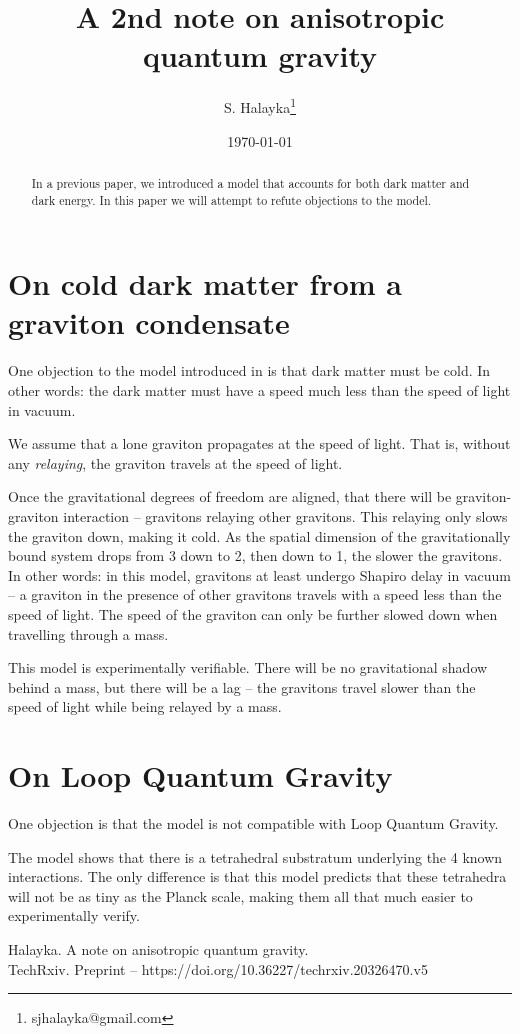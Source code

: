 \documentclass[12pt]{article}
\title{A 2nd note on anisotropic quantum gravity}
\author{S. Halayka\footnote{sjhalayka@gmail.com}}
\date{\today\;\currenttime}
\begin{document}
 
\maketitle

\begin{abstract}
In a previous paper, we introduced a model that accounts for both dark matter and dark energy. In this paper we will attempt to refute objections to the model.
\end{abstract}


\section{On cold dark matter from a graviton condensate}

One objection to the model introduced in \cite{halayka} is that dark matter must be cold. 
In other words: the dark matter must have a speed much less than the speed of light in vacuum.

We assume that a lone graviton propagates at the speed of light. 
That is, without any {\textit{relaying}}, the graviton travels at the speed of light.

Once the gravitational degrees of freedom are aligned, that there will be graviton-graviton interaction -- gravitons relaying other gravitons. 
This relaying only slows the graviton down, making it cold. 
As the spatial dimension of the gravitationally bound system drops from 3 down to 2, then down to 1, the slower the gravitons.
In other words: in this model, gravitons at least undergo Shapiro delay in vacuum -- a graviton in the presence of other gravitons travels with a speed less than the speed of light.
The speed of the graviton can only be further slowed down when travelling through a mass.

This model is experimentally verifiable. 
There will be no gravitational shadow behind a mass, but there will be a lag -- the gravitons travel slower than the speed of light while being relayed by a mass.






\section{On Loop Quantum Gravity}

One objection is that the model is not compatible with Loop Quantum Gravity.

The model shows that there is a tetrahedral substratum underlying the 4 known interactions.
The only difference is that this model predicts that these tetrahedra will not be as tiny as the Planck scale, making them all that much easier to experimentally verify.







\begin{thebibliography}{9}

 Halayka. A note on anisotropic quantum gravity.\\TechRxiv. Preprint -- https://doi.org/10.36227/techrxiv.20326470.v5


\end{thebibliography}
\end{document}
